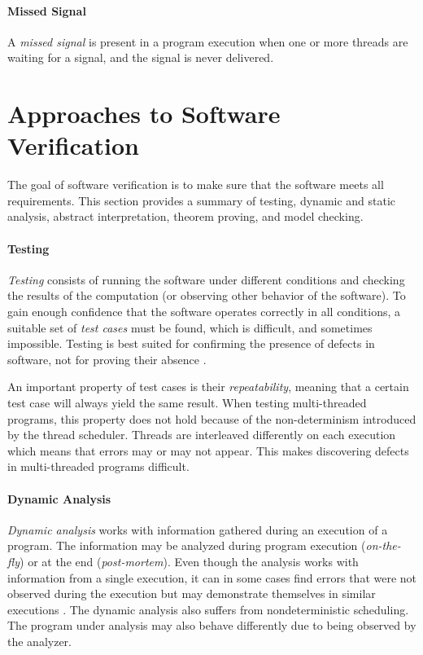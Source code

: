 \paragraph{Missed Signal}
A \emph{missed signal} is present in a program execution when one or more
threads are waiting for a signal, and the signal is never delivered.

\section{Approaches to Software Verification}
\label{approachesToSwVerification}


The goal of software verification is to make sure that the software meets all
requirements. This section provides a summary of testing, dynamic and static
analysis, abstract interpretation, theorem proving, and model checking.

\paragraph{Testing}
\emph{Testing} consists of running the software under different conditions and
checking the results of the computation (or observing other behavior of the
software). To gain enough confidence that the software operates correctly in all
conditions, a suitable set of \emph{test cases} must be found, which is
difficult, and sometimes impossible. Testing is best suited for confirming
the presence of defects in software, not for proving their absence
\cite{fundamentals}.

An important property of test cases is their \emph{repeatability}, meaning that
a certain test case will always yield the same result. When testing
multi-threaded programs, this property does not hold because of the
non-determinism introduced by the thread scheduler. Threads are interleaved
differently on each execution which means that errors may or may not appear.
This makes discovering defects in multi-threaded programs difficult.

\paragraph{Dynamic Analysis}
\emph{Dynamic analysis} works with information gathered during an execution of a
program. The information may be analyzed during program execution
(\emph{on-the-fly}) or at the end (\emph{post-mortem}). Even though the analysis
works with information from a single execution, it can in some cases find errors
that were not observed during the execution but may demonstrate themselves in
similar executions \cite{letko}. The dynamic analysis also suffers from
nondeterministic scheduling. The program under analysis may also behave
differently due to being observed by the analyzer.

